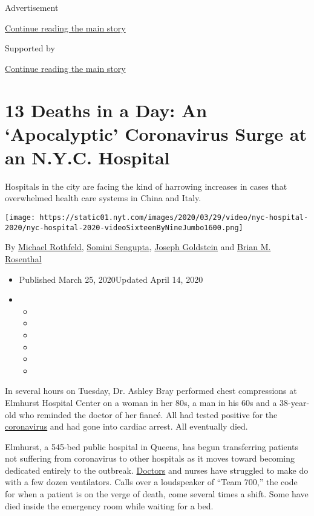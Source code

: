 Advertisement

\protect\hyperlink{after-top}{Continue reading the main story}

Supported by

\protect\hyperlink{after-sponsor}{Continue reading the main story}

\hypertarget{13-deaths-in-a-day-an-apocalyptic-coronavirus-surge-at-an-nyc-hospital}{%
\section{13 Deaths in a Day: An `Apocalyptic' Coronavirus Surge at an
N.Y.C.
Hospital}\label{13-deaths-in-a-day-an-apocalyptic-coronavirus-surge-at-an-nyc-hospital}}

Hospitals in the city are facing the kind of harrowing increases in
cases that overwhelmed health care systems in China and Italy.

\texttt{[image: https://static01.nyt.com/images/2020/03/29/video/nyc-hospital-2020/nyc-hospital-2020-videoSixteenByNineJumbo1600.png]}

By \href{https://www.nytimes.com/by/michael-rothfeld}{Michael Rothfeld},
\href{https://www.nytimes.com/by/somini-sengupta}{Somini Sengupta},
\href{https://www.nytimes.com/by/joseph-goldstein}{Joseph Goldstein} and
\href{https://www.nytimes.com/by/brian-m-rosenthal}{Brian M. Rosenthal}

\begin{itemize}
\item
  Published March 25, 2020Updated April 14, 2020
\item
  \begin{itemize}
  \item
  \item
  \item
  \item
  \item
  \item
  \end{itemize}
\end{itemize}

In several hours on Tuesday, Dr. Ashley Bray performed chest
compressions at Elmhurst Hospital Center on a woman in her 80s, a man in
his 60s and a 38-year-old who reminded the doctor of her fiancé. All had
tested positive for the
\href{https://www.nytimes.com/2020/04/14/us/armen-henderson-arrested-homeless-coronavirus-testing.html}{coronavirus}
and had gone into cardiac arrest. All eventually died.

Elmhurst, a 545-bed public hospital in Queens, has begun transferring
patients not suffering from coronavirus to other hospitals as it moves
toward becoming dedicated entirely to the outbreak.
\href{https://www.nytimes.com/2020/04/14/us/armen-henderson-arrested-homeless-coronavirus-testing.html}{Doctors}
and nurses have struggled to make do with a few dozen ventilators. Calls
over a loudspeaker of ``Team 700,'' the code for when a patient is on
the verge of death, come several times a shift. Some have died inside
the emergency room while waiting for a bed.

